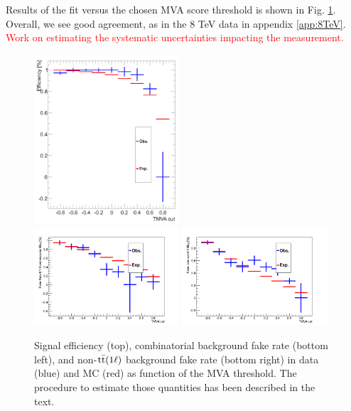  Results of the fit versus the chosen MVA score threshold is shown in Fig. \ref{fig:roofitresults13TeV}. Overall, we see good agreement, as in the 8 TeV data in appendix \ref{app:8TeV}.\\ 
  \textcolor{red}{Work on estimating the systematic uncertainties impacting the measurement.}
 
 \begin{figure}[htbp]
	\centering
	\includegraphics[width=0.48\textwidth]{figures/TOPRESOLVEDTAGGER_13TeV/c_eff.png}\\
	\includegraphics[width=0.48\textwidth]{figures/TOPRESOLVEDTAGGER_13TeV/c_fr1.png}
	\includegraphics[width=0.48\textwidth]{figures/TOPRESOLVEDTAGGER_13TeV/c_fr2.png}
	\caption{Signal efficiency (top),  combinatorial background fake rate (bottom left), and non-$\mathrm{t}\bar{\mathrm{t}}(1\ell)$ background fake rate (bottom right) in data (blue) and MC (red) as function of the MVA threshold. The procedure to estimate those quantities has been described in the text.}
	\label{fig:roofitresults13TeV}
\end{figure}


















